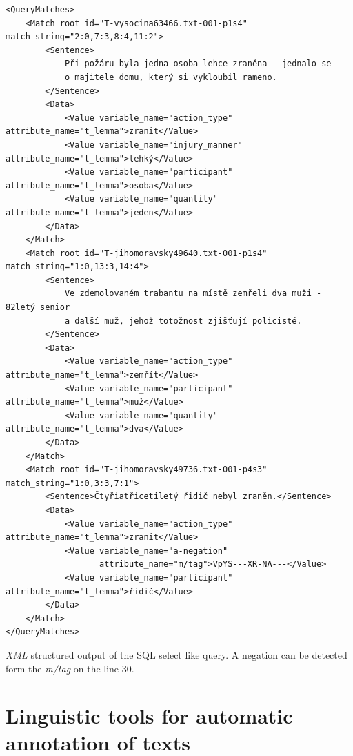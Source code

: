 \begin{listing}
\begin{verbatim}
<QueryMatches>
	<Match root_id="T-vysocina63466.txt-001-p1s4" match_string="2:0,7:3,8:4,11:2">
		<Sentence>
			Při požáru byla jedna osoba lehce zraněna - jednalo se
			o majitele domu, který si vykloubil rameno.
		</Sentence>
		<Data>
			<Value variable_name="action_type" attribute_name="t_lemma">zranit</Value>
			<Value variable_name="injury_manner" attribute_name="t_lemma">lehký</Value>
			<Value variable_name="participant" attribute_name="t_lemma">osoba</Value>
			<Value variable_name="quantity" attribute_name="t_lemma">jeden</Value>
		</Data>
	</Match>
	<Match root_id="T-jihomoravsky49640.txt-001-p1s4" match_string="1:0,13:3,14:4">
		<Sentence>
			Ve zdemolovaném trabantu na místě zemřeli dva muži - 82letý senior
			a další muž, jehož totožnost zjišťují policisté.
		</Sentence>
		<Data>
			<Value variable_name="action_type" attribute_name="t_lemma">zemřít</Value>
			<Value variable_name="participant" attribute_name="t_lemma">muž</Value>
			<Value variable_name="quantity" attribute_name="t_lemma">dva</Value>
		</Data>
	</Match>
	<Match root_id="T-jihomoravsky49736.txt-001-p4s3" match_string="1:0,3:3,7:1">
		<Sentence>Čtyřiatřicetiletý řidič nebyl zraněn.</Sentence>
		<Data>
			<Value variable_name="action_type" attribute_name="t_lemma">zranit</Value>
			<Value variable_name="a-negation" 
			       attribute_name="m/tag">VpYS---XR-NA---</Value>
			<Value variable_name="participant" attribute_name="t_lemma">řidič</Value>
		</Data>
	</Match>
</QueryMatches>
\end{verbatim}
\caption{\emph{XML} structured output of the SQL select like query. A negation can be detected form the \emph{m/tag} on the line 30.}
\label{lst:select_xml}
\end{listing}


\section{Linguistic tools for automatic annotation of texts} \label{sec:ling_tools}


